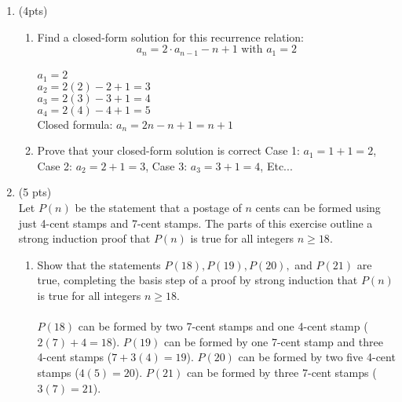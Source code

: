 \documentclass[12pt]{article}
\begin{document}
\begin{enumerate}
\item (4pts)\\
\begin{enumerate}
	\item  Find a closed-form solution for this recurrence relation:
	\[ a_n = 2 \cdot a_{n-1} - n + 1 \text{ with } a_1 = 2\]
    \\$a_{1} = 2$
    \\$a_{2} = 2(2) - 2 + 1 = 3$
    \\$a_{3} = 2(3) - 3 + 1 = 4$
    \\$a_{4} = 2(4) - 4 + 1 = 5$
    \\Closed formula: $a_{n} = 2n  - n + 1 = n + 1$
	\item  Prove that your closed-form solution is correct
    Case 1: $a_{1} = 1 + 1 = 2$, Case 2: $a_{2} = 2 + 1 = 3$, Case 3: $a_{3} = 3 + 1 = 4$, Etc...
\end{enumerate}

\item (5 pts) \\
Let $P(n)$ be the statement that a postage of $n$ cents can be
formed using just 4-cent stamps and 7-cent stamps. The
parts of this exercise outline a strong induction proof that
$P(n)$ is true for all integers $n \geq 18.$
\begin{enumerate}
	\item Show that the statements $P(18), P(19), P(20),$ and
	$P(21)$ are true, completing the basis step of a proof by
	strong induction that $P(n)$ is true for all integers $n \geq 18.$\\
    \\$P(18)$ can be formed by two 7-cent stamps and one 4-cent stamp ($2(7) + 4 = 18$). $P(19)$ can be formed by one 7-cent stamp and three 4-cent stamps ($7 + 3(4) = 19$). $P(20)$ can be formed by two five 4-cent stamps ($4(5) = 20$). $P(21)$ can be formed by three 7-cent stamps ($3(7) = 21$).\\


\end{enumerate}
\end{enumerate}
\end{document}
